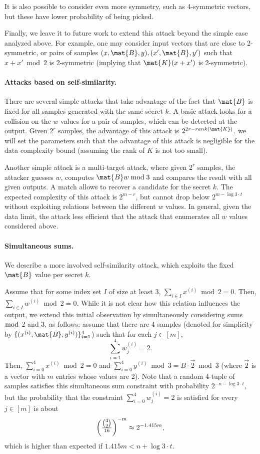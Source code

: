 It is also possible to consider even more symmetry, such as 4-symmetric vectors,
but these have lower probability of being picked.

Finally, we leave it to future work to extend this attack beyond the simple case analyzed above.
For example, one may consider input vectors that are close to 2-symmetric,
or pairs of samples $(x,\mat{B},y),(x',\mat{B},y')$ such that $x + x' \bmod 2$ is 2-symmetric
(implying that $\mat{K} (x + x')$ is 2-symmetric).


\paragraph{Attacks based on self-similarity.}

There are several simple attacks that take advantage of the fact that $\mat{B}$ is fixed for all samples generated with the same secret $k$.
A basic attack looks for a collision on the $w$ values for a pair of samples, which can be detected at the output.
Given $2^r$ samples, the advantage of this attack is $2^{2r - rank(\mat{K})}$.
we will set the parameters such that the advantage of this attack is negligible for the data complexity bound
(assuming the rank of $K$ is not too small).

Another simple attack is a multi-target attack, where given $2^r$ samples, the attacker guesses $w$, computes $\mat{B} w \bmod 3$ and compares the result with all given outputs. A match allows to recover a candidate for the secret $k$.
The expected complexity of this attack is $2^{m-r}$, but cannot drop below $2^{m - \log 3 \cdot t}$ without exploiting relations between the different $w$ values. In general, given the data limit, the attack less efficient that the attack that enumerates all $w$ values considered above.

\paragraph{Simultaneous sums.}

We describe a more involved self-similarity attack, which exploits the fixed $\mat{B}$ value per secret $k$.

Assume that for some index set $I$ of size at least 3, $\sum_{i \in I} x^{(i)} \bmod 2 = 0$. Then, $\sum_{i \in I} w^{(i)} \bmod 2 = 0$. While it is not clear how this relation influences the output,
we extend this initial observation by simultaneously considering sums $\bmod$ 2 and 3, as follows:
assume that there are 4 samples (denoted for simplicity
by $ \{(x^{(i)},\mat{B},y^{(i)})\}_{i=1}^{4}$) such that for each $j \in [m]$,
$$\sum_{i = 1}^{4} w^{(i)}_j = 2.$$
Then, $\sum_{i = 0}^{4} x^{(i)} \bmod 2 = 0$ and $\sum_{i = 0}^{4} y^{(i)} \bmod 3 = B \cdot \vec{2} \bmod 3$ (where $\vec{2}$ is a vector with $m$ entries whose values are 2).
Note that a random 4-tuple of samples satisfies this simultaneous sum constraint with probability
$2^{-n - \log 3 \cdot t}$, but the probability that the constraint $\sum_{i = 0}^{4} w^{(i)}_j = 2$ is satisfied for every $j \in [m]$ is about
$$\left( \tfrac{\tbinom{4}{2}}{16} \right) ^{-m} \approx 2^{- 1.415 m},$$
which is higher than expected if $1.415 m < n + \log 3 \cdot t $.

